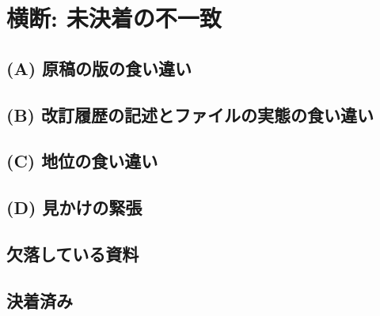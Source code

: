 
\section{横断: 未決着の不一致}

\subsection{(A) 原稿の版の食い違い}

\subsection{(B) 改訂履歴の記述とファイルの実態の食い違い}

\subsection{(C) 地位の食い違い}

\subsection{(D) 見かけの緊張}

\subsection{欠落している資料}

\subsection{決着済み}
